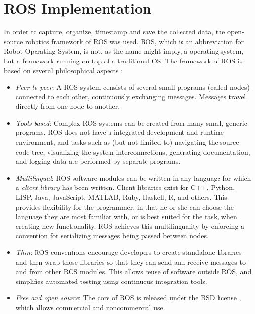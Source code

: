 \section{ROS Implementation}
In order to capture, organize, timestamp and save the collected data, the open-source robotics framework of ROS was used. ROS, which is an abbreviation for Robot Operating System, is not, as the name might imply, a operating system, but a framework running on top of a traditional OS. The framework of ROS is based on several philosophical aspects \cite{programming_ros}:
\begin{itemize}
    \item \textit{Peer to peer}: A ROS system consists of several small programs (called nodes) connected to each other, continuously exchanging messages. Messages travel directly from one node to another.
    \item \textit{Tools-based}: Complex ROS systems can be created from many small, generic programs. ROS does not have a integrated development and runtime environment, and tasks such as (but not limited to) navigating the source code tree, visualizing the system interconnections, generating documentation, and logging data are performed by separate programs.
    \item \textit{Multilingual}: ROS software modules can be written in any language for which a \textit{client library} has been written. Client libraries exist for C++, Python, LISP, Java, JavaScript, MATLAB, Ruby, Haskell, R, and others. This provides flexibility for the programmer, in that he or she can choose the language they are most familiar with, or is best suited for the task, when creating new functionality. ROS achieves this multilinguality by enforcing a convention for serializing messages being passed between nodes.
    \item \textit{Thin}: ROS conventions encourage developers to create standalone libraries and then wrap those libraries so that they can send and receive messages to and from other ROS modules. This allows reuse of software outside ROS, and simplifies automated testing using continuous integration tools.
    \item \textit{Free and open source}: The core of ROS is released under the BSD license \cite{BSD}, which allows commercial and noncommercial use.
\end{itemize}
